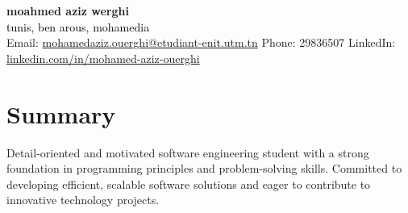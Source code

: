 \documentclass[11pt,a4paper]{article}
\begin{document}
\thispagestyle{empty}

{\LARGE \textbf{moahmed aziz werghi}}\\[6pt]
\textcolor{black}{tunis, ben arous, mohamedia} \\
Email: \href{mailto:mohamedaziz.ouerghi@etudiant-enit.utm.tn}{mohamedaziz.ouerghi@etudiant-enit.utm.tn} \quad
Phone: 29836507 \quad
LinkedIn: \href{https://www.linkedin.com/in/mohamed-aziz-ouerghi/}{linkedin.com/in/mohamed-aziz-ouerghi}

\vspace{1.5em}

\section*{Summary}
\justifying
Detail-oriented and motivated software engineering student with a strong foundation in programming principles and problem-solving skills. Committed to developing efficient, scalable software solutions and eager to contribute to innovative technology projects.
\end{document}
